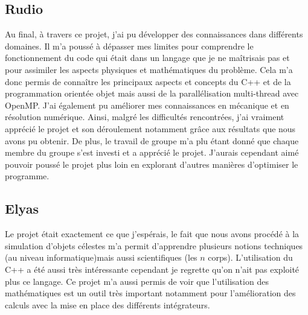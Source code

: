 \subsection{Rudio}


Au final, à travers ce projet, j'ai pu développer des connaissances dans différents domaines. Il m'a poussé à dépasser mes limites pour comprendre le fonctionnement du code qui était dans un langage que je ne maîtrisais pas et pour assimiler les aspects physiques et mathématiques du problème.
Cela m'a donc permis de connaître les principaux aspects et concepts du C++ et de la programmation orientée objet mais aussi de la parallélisation multi-thread avec OpenMP. J'ai également pu améliorer mes connaissances en mécanique et en résolution numérique. 
Ainsi, malgré les difficultés rencontrées, j'ai vraiment apprécié le projet et son déroulement notamment grâce aux résultats que nous avons pu obtenir. De plus, le travail de groupe m'a plu étant donné que chaque membre du groupe s'est investi et a apprécié le projet.
J'aurais cependant aimé pouvoir poussé le projet plus loin en explorant d'autres manières d'optimiser le programme.


\subsection{Elyas}


Le projet était exactement ce que j'espérais, le fait que nous avons procédé à la simulation d'objets célestes m'a permit d'apprendre plusieurs notions techniques (au niveau informatique)mais aussi scientifiques (les $n$ corps). L'utilisation du C++ a été aussi très intéressante cependant je regrette qu'on n'ait pas exploité plus ce langage. Ce projet m'a aussi permis de voir que l'utilisation des mathématiques est un outil très important notamment pour l'amélioration des calculs avec la mise en place des différents intégrateurs.


